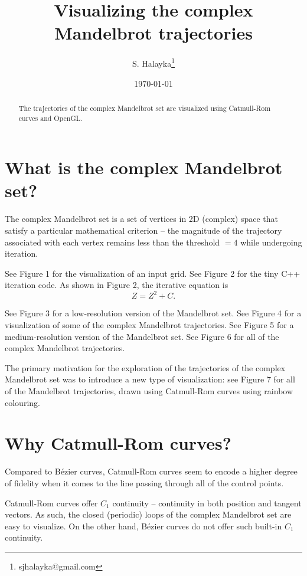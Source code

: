 \documentclass[12pt]{article}
\title{Visualizing the complex Mandelbrot trajectories}
\author{S. Halayka\footnote{sjhalayka@gmail.com}}
\date{\today}
\begin{document}
\maketitle

\begin{abstract}
The trajectories of the complex Mandelbrot set are visualized using Catmull-Rom curves and OpenGL.
\end{abstract}



\section{What is the complex Mandelbrot set?}

The complex Mandelbrot set is a set of vertices in 2D (complex) space that satisfy a particular mathematical criterion -- the magnitude of the trajectory associated with each vertex remains less than the threshold $= 4$ while undergoing iteration.

See Figure 1 for the visualization of an input grid.
See Figure 2 for the tiny C++ iteration code.
As shown in Figure 2, the iterative equation is
\begin{equation}
Z = Z^2 + C.
\end{equation}

See Figure 3 for a low-resolution version of the Mandelbrot set.
See Figure 4 for a visualization of some of the complex Mandelbrot trajectories.
See Figure 5 for a medium-resolution version of the Mandelbrot set.
See Figure 6 for all of the complex Mandelbrot trajectories.

The primary motivation for the exploration of the trajectories of the complex Mandelbrot set was to introduce a new type of visualization: see Figure 7 for all of the Mandelbrot trajectories, drawn using Catmull-Rom curves using rainbow colouring.


\section{Why Catmull-Rom curves?}

Compared to  B\'ezier curves, Catmull-Rom curves seem to encode a higher degree of fidelity when it comes to the line passing through all of the control points.

Catmull-Rom curves offer $C_1$ continuity -- continuity in both position and tangent vectors.
As such, the closed (periodic) loops of the complex Mandelbrot set are easy to visualize.
On the other hand, B\'ezier curves do not offer such built-in $C_1$ continuity.
\end{document}
